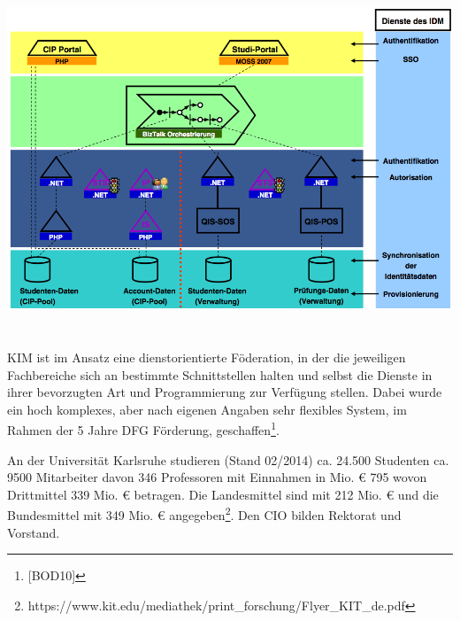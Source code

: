 \documentclass[a4paper]{article}
\makeatletter
\newcommand\captionof[1]{\def\@captype{#1}\caption}
\makeatother
\begin{document}
{\centering \includegraphics[width=15.404cm,height=10.433cm]{INMAusarbeitung02-img/INMAusarbeitung02-img012.png}
\captionof{figure}[Erreichtes im Überblick für Karlsruhe (Juling Best Practice Workshop 2008)]{Erreichtes im Überblick
für Karlsruhe \textcolor[rgb]{1.0,0.2,0.2}{(}\textcolor{red}{Juling Best Practice Workshop 2008)}}
\par}
{\sffamily
KIM ist im Ansatz eine dienstorientierte F\"{o}deration, in der die jeweiligen Fachbereiche sich an bestimmte
Schnittstellen halten und selbst die Dienste in ihrer bevorzugten Art und Programmierung zur Verfügung stellen. Dabei
wurde ein hoch komplexes, aber nach eigenen Angaben sehr flexibles System, im Rahmen der 5 Jahre DFG Förderung,
geschaffen\footnote{[BOD10]}.}


\bigskip

{\sffamily
An der Universität Karlsruhe studieren (Stand 02/2014) ca. 24.500 Studenten ca. 9500 Mitarbeiter davon 346 Professoren
mit Einnahmen in Mio. € 795 wovon Drittmittel 339 Mio. € betragen. Die Landesmittel sind mit 212 Mio. € und die
Bundesmittel mit 349 Mio. € angegeben\footnote{https://www.kit.edu/mediathek/print\_forschung/Flyer\_KIT\_de.pdf}. Den
CIO bilden Rektorat und Vorstand.}
\end{document}
